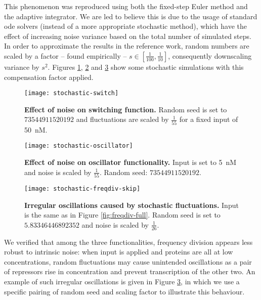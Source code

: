     This phenomenon was reproduced using both the fixed-step Euler method and the adaptive  integrator.
    We are led to believe this is due to the usage of standard \ac{ode} solvers (instead of a more appropriate stochastic method), which have the effect of increasing noise variance based on the total number of simulated steps.
    In order to approximate the results in the reference work, random numbers are scaled by a factor -- found empirically -- $s \in [\frac{1}{100}, \frac{1}{10}]$, consequently downscaling variance by $s^2$.
    Figures \ref{fig:stochastic-switch}, \ref{fig:stochastic-oscillator} and \ref{fig:stochastic-freqdiv-skip} show some stochastic simulations with this compensation factor applied.

    \begin{figure}[!htb]
      \centering
      \texttt{[image: stochastic-switch]}
      \caption{\textbf{Effect of noise on switching function.} Random seed is set to $73544911520192$ and fluctuations are scaled by $\frac{1}{55}$ for a fixed input of \SI{50}{\nano M}.}
      \label{fig:stochastic-switch}
    \end{figure}

    \begin{figure}[!htb]
      \centering
      \texttt{[image: stochastic-oscillator]}
      \caption{\textbf{Effect of noise on oscillator functionality.} Input is set to \SI{5}{\nano M} and noise is scaled by $\frac{1}{55}$. Random seed: $73544911520192$.}
      \label{fig:stochastic-oscillator}
    \end{figure}

    \begin{figure}[!htb]
      \centering
      \texttt{[image: stochastic-freqdiv-skip]}
      \caption{\textbf{Irregular oscillations caused by stochastic fluctuations.} Input is the same as in Figure \ref{fig:freqdiv-full}. Random seed is set to $5.83346446892352$ and noise is scaled by $\frac{1}{26}$.}
      \label{fig:stochastic-freqdiv-skip}
    \end{figure}

    We verified that among the three functionalities, frequency division appears less robust to intrinsic noise: when input is applied and proteins are all at low concentrations, random fluctuations may cause unintended oscillations as a pair of repressors rise in concentration and prevent transcription of the other two.
    An example of such irregular oscillations is given in Figure \ref{fig:stochastic-freqdiv-skip}, in which we use a specific pairing of random seed and scaling factor to illustrate this behaviour.


